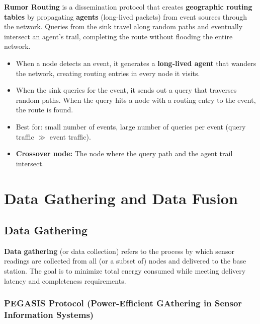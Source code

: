 \documentclass[12pt,a4paper]{article}
\begin{document}
\begin{tcolorbox}[defbox, title={\textbf{Rumor Routing --- Definition}}]
\textbf{Rumor Routing} is a dissemination protocol that creates \textbf{geographic routing tables} by propagating \textbf{agents} (long-lived packets) from event sources through the network. Queries from the sink travel along random paths and eventually intersect an agent's trail, completing the route without flooding the entire network.
\end{tcolorbox}

\begin{itemize}[leftmargin=*, itemsep=3pt]
  \item When a node detects an event, it generates a \textbf{long-lived agent} that wanders the network, creating routing entries in every node it visits.
  \item When the sink queries for the event, it sends out a query that traverses random paths. When the query hits a node with a routing entry to the event, the route is found.
  \item Best for: small number of events, large number of queries per event (query traffic $\gg$ event traffic).
  \item \textbf{Crossover node:} The node where the query path and the agent trail intersect.
\end{itemize}

\section{Data Gathering and Data Fusion}

\subsection{Data Gathering}

\begin{tcolorbox}[defbox, title={\textbf{Data Gathering --- Definition}}]
\textbf{Data gathering} (or data collection) refers to the process by which sensor readings are collected from all (or a subset of) nodes and delivered to the base station. The goal is to minimize total energy consumed while meeting delivery latency and completeness requirements.
\end{tcolorbox}

\subsubsection*{PEGASIS Protocol (Power-Efficient GAthering in Sensor Information Systems)}
\end{document}
